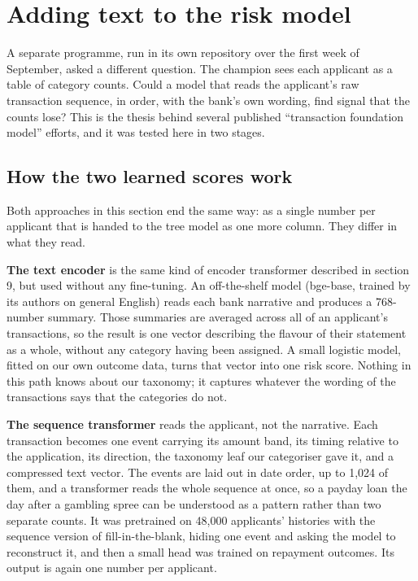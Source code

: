 \section{Adding text to the risk model}
A separate programme, run in its own repository over the first week of September, asked a different question. The champion sees each applicant as a table of category counts. Could a model that reads the applicant's raw transaction sequence, in order, with the bank's own wording, find signal that the counts lose? This is the thesis behind several published ``transaction foundation model'' efforts, and it was tested here in two stages.

\subsection{How the two learned scores work}
Both approaches in this section end the same way: as a single number per applicant that is handed to the tree model as one more column. They differ in what they read.

\textbf{The text encoder} is the same kind of encoder transformer described in section 9, but used without any fine-tuning. An off-the-shelf model (bge-base, trained by its authors on general English) reads each bank narrative and produces a 768-number summary. Those summaries are averaged across all of an applicant's transactions, so the result is one vector describing the flavour of their statement as a whole, without any category having been assigned. A small logistic model, fitted on our own outcome data, turns that vector into one risk score. Nothing in this path knows about our taxonomy; it captures whatever the wording of the transactions says that the categories do not.

\textbf{The sequence transformer} reads the applicant, not the narrative. Each transaction becomes one event carrying its amount band, its timing relative to the application, its direction, the taxonomy leaf our categoriser gave it, and a compressed text vector. The events are laid out in date order, up to 1,024 of them, and a transformer reads the whole sequence at once, so a payday loan the day after a gambling spree can be understood as a pattern rather than two separate counts. It was pretrained on 48,000 applicants' histories with the sequence version of fill-in-the-blank, hiding one event and asking the model to reconstruct it, and then a small head was trained on repayment outcomes. Its output is again one number per applicant.

